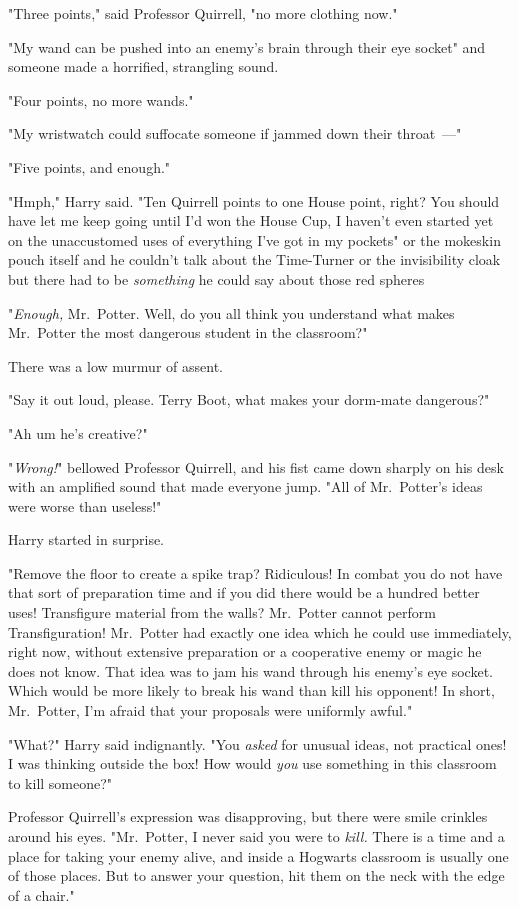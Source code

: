 "Three points," said Professor Quirrell, "no more clothing now."

"My wand can be pushed into an enemy's brain through their eye socket" and
someone made a horrified, strangling sound.

"Four points, no more wands."

"My wristwatch could suffocate someone if jammed down their throat~---"

"Five points, and enough."

"Hmph," Harry said. "Ten Quirrell points to one House point, right? You should
have let me keep going until I'd won the House Cup, I haven't even started yet
on the unaccustomed uses of everything I've got in my pockets" or the mokeskin
pouch itself and he couldn't talk about the Time-Turner or the invisibility
cloak but there had to be \emph{something} he could say about those red
spheres{\el}

"\emph{Enough,} Mr.~Potter. Well, do you all think you understand what makes
Mr.~Potter the most dangerous student in the classroom?"

There was a low murmur of assent.

"Say it out loud, please. Terry Boot, what makes your dorm-mate dangerous?"

"Ah{\el} um{\el} he's creative?"

"\emph{Wrong!}" bellowed Professor Quirrell, and his fist came down sharply on
his desk with an amplified sound that made everyone jump. "All of Mr.~Potter's
ideas were worse than useless!"

Harry started in surprise.

"Remove the floor to create a spike trap? Ridiculous! In combat you do not have
that sort of preparation time and if you did there would be a hundred better
uses! Transfigure material from the walls? Mr.~Potter cannot perform
Transfiguration! Mr.~Potter had exactly one idea which he could use
immediately, right now, without extensive preparation or a cooperative enemy or
magic he does not know. That idea was to jam his wand through his enemy's eye
socket. Which would be more likely to break his wand than kill his opponent! In
short, Mr.~Potter, I'm afraid that your proposals were uniformly awful."

"What?" Harry said indignantly. "You \emph{asked} for unusual ideas, not
practical ones! I was thinking outside the box! How would \emph{you} use
something in this classroom to kill someone?"

Professor Quirrell's expression was disapproving, but there were smile crinkles
around his eyes. "Mr.~Potter, I never said you were to \emph{kill.} There is a
time and a place for taking your enemy alive, and inside a Hogwarts classroom
is usually one of those places. But to answer your question, hit them on the
neck with the edge of a chair."

